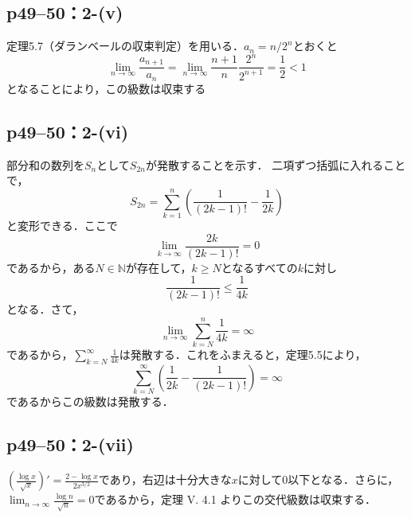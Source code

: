 \subsection*{p49--50：2-(v)}


\begin{tanswer}
    定理5.7（ダランベールの収束判定）を用いる．$a_n=n/2^n$とおくと
    \[
        \lim_{n \to \infty}\frac{a_{n+1}}{a_n}=\lim_{n \to \infty}\frac{n+1}{n}\frac{2^n}{2^{n+1}}=\frac{1}{2}<1
    \]
    となることにより，この級数は収束する
\end{tanswer}

\subsection*{p49--50：2-(vi)}

\begin{tanswer}
    部分和の数列を$S_{n}$として$S_{2n}$が発散することを示す． 二項ずつ括弧に入れることで，
    \[
        S_{2n} = \sum ^{n}_{k=1} \left (\frac{1}{(2k-1)!} - \frac{1}{2k} \right )
    \]
    と変形できる．ここで
    \[
        \lim_{k \to \infty} \frac{2k}{(2k-1)!} = 0
    \]
    であるから，ある$N \in \mathbb{N}$が存在して，$k \geq N$となるすべての$k$に対し
    \[
        \frac{1}{(2k-1)!} \leq \frac{1}{4k}
    \]
    となる．さて，
    \[
        \lim_{n \to \infty} \sum ^{n}_{k=N} \frac{1}{4k} = \infty
    \]
    であるから，$\sum ^{\infty}_{k=N} \frac{1}{4k}$は発散する．これをふまえると，定理5.5により，
    \[
        \sum^{\infty}_{k=N} \left (\frac{1}{2k} - \frac{1}{(2k-1)!}\right) =\infty
    \]
    であるからこの級数は発散する．
\end{tanswer}



\subsection*{p49--50：2-(vii)}
\begin{tanswer}
    $\left (\frac{\log x}{\sqrt x}\right)' = \frac{2-\log x}{2x^{3/2}}$であり，右辺は十分大きな$x$に対して$0$以下となる．さらに，$\lim _{n \to \infty} \frac{\log n}{\sqrt n} = 0$であるから，定理 V. 4.1 よりこの交代級数は収束する．
\end{tanswer}

